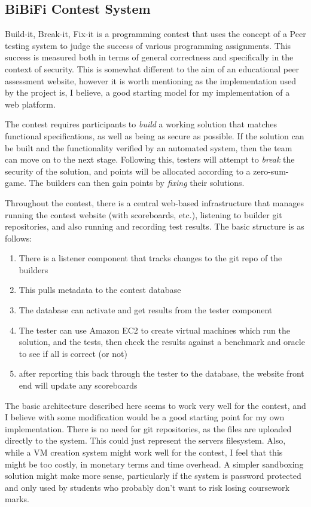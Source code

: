 \documentclass[a4paper,11pt]{report}
\begin{document}
\subsection{BiBiFi Contest System}
Build-it, Break-it, Fix-it\cite{ruef_build_2016} is a programming contest that uses the concept of a Peer testing system to judge the success of various programming assignments. This success is measured both in terms of general correctness and specifically in the context of security. This is somewhat different to the aim of an educational peer assessment website, however it is worth mentioning as the implementation used by the project is, I believe, a good starting model for my implementation of a web platform.\par
The contest requires participants to \textit{build} a working solution that matches functional specifications, as well as being as secure as possible. If the solution can be built and the functionality verified by an automated system, then the team can move on to the next stage. Following this, testers will attempt to \textit{break} the security of the solution, and points will be allocated according to a zero-sum-game. The builders can then gain points by \textit{fixing} their solutions.\par
Throughout the contest, there is a central web-based infrastructure that manages running the contest website (with scoreboards, etc.), listening to builder git repositories, and also running and recording test results. The basic structure is as follows:
\begin{enumerate}
 \item There is a listener component that tracks changes to the git repo of the builders
 \item This pulls metadata to the contest database
 \item The database can activate and get results from the tester component
 \item The tester can use Amazon EC2 to create virtual machines which run the solution, and the tests, then check the results against a benchmark and oracle to see if all is correct (or not)
 \item after reporting this back through the tester to the database, the website front end will update any scoreboards
\end{enumerate}
The basic architecture described here seems to work very well for the contest, and I believe with some modification would be a good starting point for my own implementation. There is no need for git repositories, as the files are uploaded directly to the system. This could just represent the servers filesystem. Also, while a VM creation system might work well for the contest, I feel that this might be too costly, in monetary terms and time overhead. A simpler sandboxing solution might make more sense, particularly if the system is password protected and only used by students who probably don't want to risk losing coursework marks.
\end{document}
